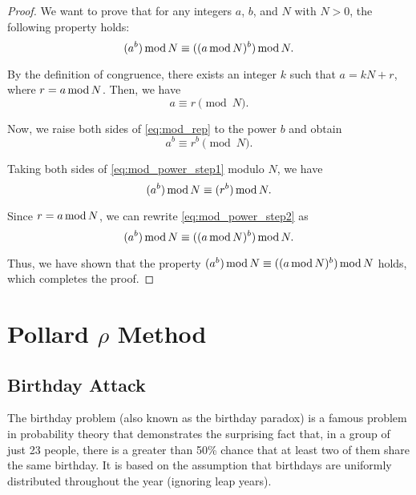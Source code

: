 \documentclass[12pt,openany]{book}
\theoremstyle{definition}
\renewcommand{\mod}{\operatorname{\textnormal{mod}}}
\begin{document}
	\begin{proof}
		We want to prove that for any integers $a$, $b$, and $N$ with $N > 0$, the following property holds:
		\begin{equation} \label{eq:mod_power}
		(a^b) \mod N \equiv ((a \mod N)^b) \mod N.
		\end{equation}
		
		By the definition of congruence, there exists an integer $k$ such that $a = kN + r$, where $r = a \mod N$. Then, we have
		\begin{equation} \label{eq:mod_rep}
		a \equiv r \pmod{N}.
		\end{equation}
		
		Now, we raise both sides of \eqref{eq:mod_rep} to the power $b$ and obtain
		\begin{equation} \label{eq:mod_power_step1}
		a^b \equiv r^b \pmod{N}.
		\end{equation}
		
		Taking both sides of \eqref{eq:mod_power_step1} modulo $N$, we have
		\begin{equation} \label{eq:mod_power_step2}
		(a^b) \mod N \equiv (r^b) \mod N.
		\end{equation}
		
		Since $r = a \mod N$, we can rewrite \eqref{eq:mod_power_step2} as
		\begin{equation} \label{eq:mod_power_step3}
		(a^b) \mod N \equiv ((a \mod N)^b) \mod N.
		\end{equation}
		
		Thus, we have shown that the property $(a^b) \mod N \equiv ((a \mod N)^b) \mod N$ holds, which completes the proof.
	\end{proof}
	
	
	\chapter{Pollard $\rho$ Method}
	\section{Birthday Attack}
	
	The birthday problem (also known as the birthday paradox) is a famous problem in probability theory that demonstrates the surprising fact that, in a group of just 23 people, there is a greater than 50\% chance that at least two of them share the same birthday. It is based on the assumption that birthdays are uniformly distributed throughout the year (ignoring leap years).
	
\end{document}
